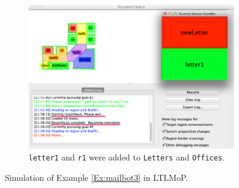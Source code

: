 \begin{figure}[h]
	\vspace{4 pt}
	\begin{subfigure}[b]{0.99\columnwidth}
	\includegraphics[width=0.99\columnwidth, clip]{./img/sim3.jpg}
	\caption{\texttt{letter1} and \texttt{r1} were added to \texttt{Letters} and \texttt{Offices}.} 
	\label{Fig:sim3}
	\end{subfigure}
	\caption{Simulation of Example \ref{Ex:mailbot3} in LTLMoP.}\label{Fig:sim}
\end{figure}

